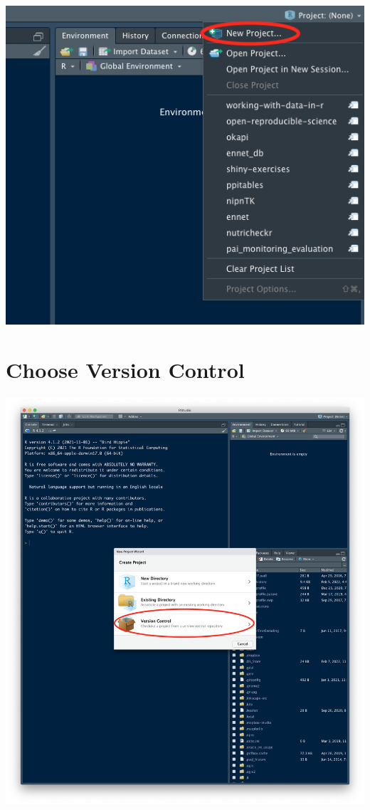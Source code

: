 \documentclass[
  12pt,
]{book}
\begin{document}
\includegraphics{images/clone_step2.png}

\hypertarget{choose-version-control}{%
\section{Choose Version Control}\label{choose-version-control}}

\includegraphics{images/clone_step3.png}
\end{document}
